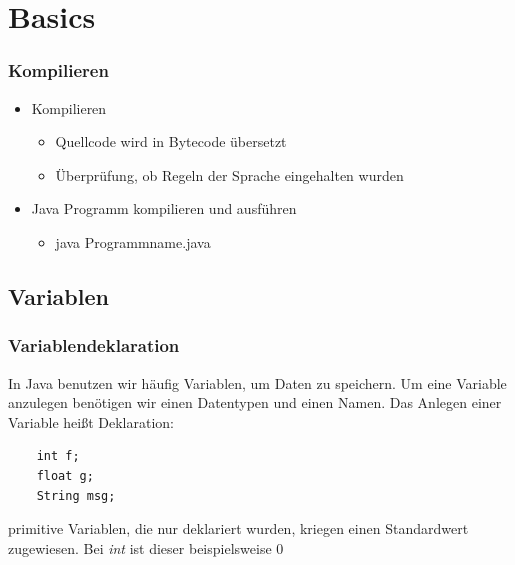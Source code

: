 \section{Basics}

\begin{frame}[fragile] %
\frametitle{Kompilieren}

\begin{itemize}
\item Kompilieren
    \begin{itemize}
        \item Quellcode wird in Bytecode übersetzt
        \item Überprüfung, ob Regeln der Sprache eingehalten wurden
    \end{itemize}
\item Java Programm kompilieren und ausführen
\begin{itemize}
        \item java Programmname.java
    \end{itemize} 
\end{itemize}
    
\end{frame}

\subsection{Variablen}

\begin{frame}[fragile] %
\frametitle{Variablendeklaration}

In Java benutzen wir häufig Variablen, um Daten zu speichern.
Um eine Variable anzulegen benötigen wir einen Datentypen und einen Namen. Das Anlegen einer Variable heißt Deklaration:
\begin{lstlisting}
    int f;
    float g;
    String msg;
\end{lstlisting}
primitive Variablen, die nur deklariert wurden, kriegen einen Standardwert zugewiesen. Bei \textit{int} ist dieser beispielsweise 0
    
\end{frame}

